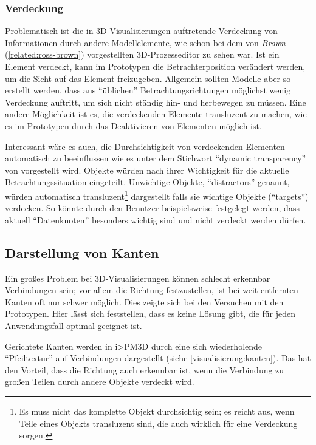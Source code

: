 \documentclass[a4paper,10pt]{sphinxmanual}
\begin{document}
\subsubsection{Verdeckung}
\label{visualisierung:verdeckung}
Problematisch ist die in 3D-Visualisierungen auftretende Verdeckung von Informationen durch andere Modellelemente, wie schon bei dem von {\hyperref[related:ross-brown]{\emph{Brown}}} (\autoref*{related:ross-brown}) vorgestellten 3D-Prozesseditor zu sehen war.
Ist ein Element verdeckt, kann im Prototypen die Betrachterposition verändert werden, um die Sicht auf das Element freizugeben.
Allgemein sollten Modelle aber so erstellt werden, dass aus "`üblichen"' Betrachtungsrichtungen möglichst wenig Verdeckung auftritt, um sich nicht ständig hin- und herbewegen zu müssen.
Eine andere Möglichkeit ist es, die verdeckenden Elemente transluzent zu machen, wie es im Prototypen durch das Deaktivieren von Elementen möglich ist.

Interessant wäre es auch, die Durchsichtigkeit von verdeckenden Elementen automatisch zu beeinflussen wie es unter dem Stichwort "`dynamic transparency"' von \cite{elmqvist_dynamic_2009} vorgestellt wird.
Objekte würden nach ihrer Wichtigkeit für die aktuelle Betrachtungssituation eingeteilt.
Unwichtige Objekte, "`distractors"' genannt, würden automatisch transluzent\footnote{
Es muss nicht das komplette Objekt durchsichtig sein; es reicht aus, wenn Teile eines Objekts transluzent sind, die auch wirklich für eine Verdeckung sorgen.
} dargestellt falls sie wichtige Objekte ("`targets"') verdecken.
So könnte durch den Benutzer beispielsweise festgelegt werden, dass aktuell "`Datenknoten"' besonders wichtig sind und nicht verdeckt werden dürfen.


\subsection{Darstellung von Kanten}
\label{visualisierung:darstellung-von-kanten}
Ein großes Problem bei 3D-Visualisierungen können schlecht erkennbar Verbindungen sein; vor allem die Richtung festzustellen, ist bei weit entfernten Kanten oft nur schwer möglich.
Dies zeigte sich bei den Versuchen mit den Prototypen.
Hier lässt sich feststellen, dass es keine Lösung gibt, die für jeden Anwendungsfall optimal geeignet ist.

Gerichtete Kanten werden in i\textgreater{}PM3D durch eine sich wiederholende "`Pfeiltextur"' auf Verbindungen dargestellt ({\hyperref[visualisierung:kanten]{siehe}} \autoref*{visualisierung:kanten}).
Das hat den Vorteil, dass die Richtung auch erkennbar ist, wenn die Verbindung zu großen Teilen durch andere Objekte verdeckt wird.
\end{document}

